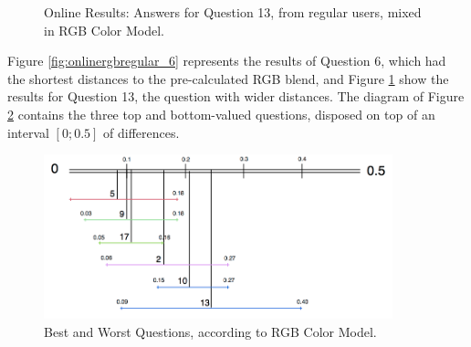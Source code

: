 \begin{figure}[!htbp]
\begin{minipage}{0.48\textwidth}
    \caption[Online Results: Answers for Question 13, from regular users, mixed in RGB Color Model.]{Online Results: Answers for Question 13, from regular users, mixed in RGB Color Model.}
    \label{fig:onlinergbregular_13}
  \end{minipage}
\end{figure}
%
Figure \ref{fig:onlinergbregular_6} represents the results of Question 6, which had the shortest distances to the pre-calculated RGB blend, and Figure \ref{fig:onlinergbregular_13} show the results for Question 13, the question with wider
distances. The diagram of Figure \ref{fig:rgb_analysis} contains the three top and bottom-valued questions, disposed on top of an interval $[0 ; 0.5]$ of differences. \par
%
\begin{figure}[!htbp]
  \centering
  \includegraphics[width=0.9\textwidth]{images/rgb_questions_analysis.png}
  \caption[Best and Worst Questions, according RGB Color Model.]{Best and Worst Questions, according to RGB Color Model.}
  \label{fig:rgb_analysis}
\end{figure}
%
%
